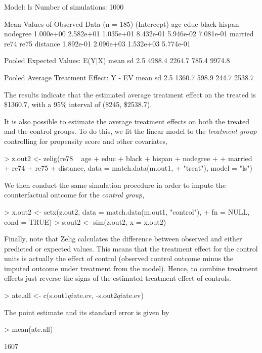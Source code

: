 \begin{enumerate}
\begin{Schunk}
\begin{Soutput}
  Model: ls 
  Number of simulations: 1000 

Mean Values of Observed Data (n = 185) 
(Intercept)         age        educ       black      hispan    nodegree 
  1.000e+00   2.582e+01   1.035e+01   8.432e-01   5.946e-02   7.081e-01 
    married        re74        re75    distance 
  1.892e-01   2.096e+03   1.532e+03   5.774e-01 

Pooled Expected Values: E(Y|X)
  mean     sd   2.5%  97.5% 
4988.4 2264.7  785.4 9974.8 

Pooled Average Treatment Effect: Y - EV
  mean     sd   2.5%  97.5% 
1360.7  598.9  244.7 2538.7 

\end{Soutput}
\end{Schunk}
The results indicate that the estimated average treatment effect on
the treated is 
\$1360.7,
with a 95\% interval of
(\$245,
\$2538.7).

It is also possible to estimate the average treatment effects on both
the treated and the control groups. To do this, we fit the linear
model to the {\it treatment group} controlling for propensity score
and other covariates,
\begin{Schunk}
\begin{Sinput}
> z.out2 <- zelig(re78 ~ age + educ + black + hispan + nodegree + 
+     married + re74 + re75 + distance, data = match.data(m.out1, 
+     "treat"), model = "ls")
\end{Sinput}
\end{Schunk}
We then conduct the same simulation procedure in order to impute the
counterfactual outcome for the {\it control group},
\begin{Schunk}
\begin{Sinput}
> x.out2 <- setx(z.out2, data = match.data(m.out1, "control"), 
+     fn = NULL, cond = TRUE)
> s.out2 <- sim(z.out2, x = x.out2)
\end{Sinput}
\end{Schunk}
Finally, note that Zelig calculates the difference between observed
and either predicted or expected values.  This means that the
treatment effect for the control units is actually the effect of
control (observed control outcome minus the imputed outcome under
treatment from the model).  Hence, to combine treatment effects just
reverse the signs of the estimated treatment effect of controls.
\begin{Schunk}
\begin{Sinput}
> ate.all <- c(s.out1$qi$ate.ev, -s.out2$qi$ate.ev)
\end{Sinput}
\end{Schunk}
The point estimate and its standard error is given by
\begin{Schunk}
\begin{Sinput}
> mean(ate.all)
\end{Sinput}
\begin{Soutput}
[1] 1607


\end{Soutput}
\end{Schunk}
\end{enumerate}
